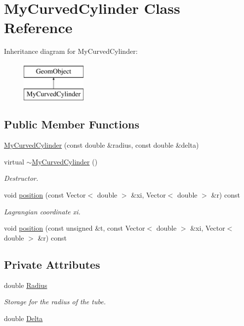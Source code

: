 \hypertarget{classMyCurvedCylinder}{}\section{My\+Curved\+Cylinder Class Reference}
\label{classMyCurvedCylinder}
Inheritance diagram for My\+Curved\+Cylinder\+:\begin{figure}[H]
\begin{center}
\leavevmode
\includegraphics[height=2.000000cm]{classMyCurvedCylinder}
\end{center}
\end{figure}
\subsection*{Public Member Functions}
\begin{DoxyCompactItemize}
\item 
\hyperlink{classMyCurvedCylinder_a2af55228ec569d864957af4ab7d63d2b}{My\+Curved\+Cylinder} (const double \&radius, const double \&delta)
\item 
virtual \hyperlink{classMyCurvedCylinder_af474ed1dc8e4a1d433d4f1e77712b0a3}{$\sim$\+My\+Curved\+Cylinder} ()
\begin{DoxyCompactList}\small\item\em Destructor. \end{DoxyCompactList}\item 
void \hyperlink{classMyCurvedCylinder_a6b0a9178fef82a1279efded76a611692}{position} (const Vector$<$ double $>$ \&xi, Vector$<$ double $>$ \&r) const
\begin{DoxyCompactList}\small\item\em Lagrangian coordinate xi. \end{DoxyCompactList}\item 
void \hyperlink{classMyCurvedCylinder_a2752720f3a5d185264a10f9b749e5b7a}{position} (const unsigned \&t, const Vector$<$ double $>$ \&xi, Vector$<$ double $>$ \&r) const
\end{DoxyCompactItemize}
\subsection*{Private Attributes}
\begin{DoxyCompactItemize}
\item 
double \hyperlink{classMyCurvedCylinder_aaf7aa0ded93fced8b112d61e634a9df2}{Radius}
\begin{DoxyCompactList}\small\item\em Storage for the radius of the tube. \end{DoxyCompactList}\item 
double \hyperlink{classMyCurvedCylinder_abacb5dddfb1971d098b2c07608fdaf50}{Delta}
\end{DoxyCompactItemize}


